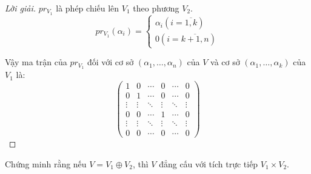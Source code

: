 \documentclass[class=linearalgebra,crop=false]{standalone}
\begin{document}
\begin{proof}[Lời giải]
    $pr_{V_{1}}$ là phép chiếu lên $V_{1}$ theo phương $V_{2}$.
    \[
        pr_{V_{1}}(\alpha_{i}) =
        \begin{cases}
            \alpha_{i} (i = \overline{1, k}) \\
            0 (i = \overline{k+1,n})
        \end{cases}
    \]
    \par Vậy ma trận của $pr_{V_{1}}$ đối với cơ sở $(\alpha_{1}, \ldots, \alpha_{n})$ của $V$ và cơ sở $(\alpha_{1}, \ldots, \alpha_{k})$ của $V_{1}$ là:
    \[
        \begin{pmatrix}
            1      & 0      & \cdots & 0      & \cdots & 0      \\
            0      & 1      & \cdots & 0      & \cdots & 0      \\
            \vdots & \vdots & \ddots & \vdots & \ddots & \vdots \\
            0      & 0      & \cdots & 1      & \cdots & 0      \\
            \vdots & \vdots & \ddots & \vdots & \ddots & \vdots \\
            0      & 0      & \cdots & 0      & \cdots & 0
        \end{pmatrix}
    \]
\end{proof}

\begin{exercise}
    Chứng minh rằng nếu $V = V_{1}\oplus V_{2}$, thì $V$ đẳng cấu với tích trực tiếp $V_{1}\times V_{2}$.
\end{exercise}
\end{document}

